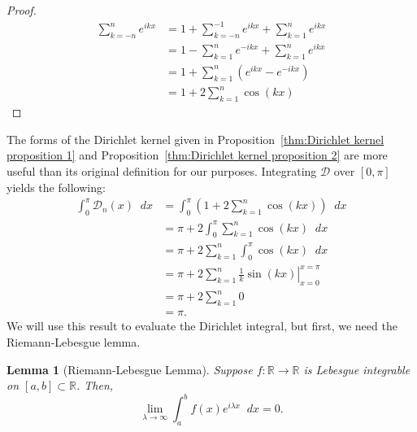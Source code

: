 \documentclass[a4paper]{article}
\newcommand*\diff{\mathop{}\!d} %
\newtheorem{lemma}[theorem]{Lemma}
\theoremstyle{definition}
\begin{document}
\begin{proof}
    \begin{align*}
        \sum_{k = -n}^{n} e^{ikx} & = 1 + \sum_{k = -n}^{-1} e^{ikx} + \sum_{k = 1}^{n} e^{ikx} \\
                                  & = 1 - \sum_{k = 1}^{n} e^{-ikx} + \sum_{k = 1}^{n} e^{ikx}  \\
                                  & = 1 + \sum_{k = 1}^{n} \left(e^{ikx} - e^{-ikx}\right)      \\
                                  & = 1 + 2\sum_{k=1}^{n} \cos(kx)
    \end{align*}
\end{proof}
The forms of the Dirichlet kernel given in Proposition~\ref{thm:Dirichlet kernel proposition 1} and Proposition~\ref{thm:Dirichlet kernel proposition 2} are more useful than its original definition for our purposes.
Integrating $\mathcal{D}$ over $[0, \pi]$ yields the following:
\begin{align*}
    \int_{0}^{\pi} \mathcal{D}_n (x) \diff x & = \int_{0}^{\pi} \left( 1 + 2\sum_{k = 1}^{n} \cos(kx) \right) \diff x       \\
                                             & = \pi + 2 \int_{0}^{\pi} \sum_{k = 1}^{n} \cos(kx)  \diff x                  \\
                                             & = \pi + 2 \sum_{k = 1}^{n} \int_{0}^{\pi} \cos(kx)    \diff x                \\
                                             & = \pi + 2 \sum_{k = 1}^{n} \left. \frac{1}{k} \sin(kx) \right|_{x=0}^{x=\pi} \\
                                             & = \pi + 2 \sum_{k = 1}^{n} 0                                                 \\
                                             & = \pi.
\end{align*}
We will use this result to evaluate the Dirichlet integral, but first, we need the Riemann-Lebesgue lemma.
\begin{lemma}[Riemann-Lebesgue Lemma] \label{thm:Riemann-Lebesgue lemma}
    Suppose $f: \mathbb{R} \to \mathbb{R}$ is Lebesgue integrable on $[a,b] \subset \mathbb{R}$.
    Then,
    \begin{equation} \label{eq:Riemann-Lebesgue lemma equation}
        \lim_{\lambda \to \infty} \int_{a}^{b} f(x) e^{i\lambda x} \diff x = 0.
    \end{equation}
\end{lemma}
\end{document}
